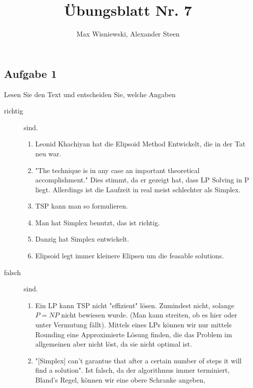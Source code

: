 \documentclass[11pt,a4paper,ngerman]{article}
\date{}
\title{Übungsblatt Nr. 7}
\author{Max Wisniewski, Alexander Steen}
\begin{document}
\renewcommand{\figurename}{Figure}
\maketitle
\thispagestyle{fancy}


\subsection*{Aufgabe 1}

Lesen Sie den Text und entscheiden Sie, welche Angaben

\begin{description}
    \item[richtig] sind.\\
        \begin{enumerate}[1.]
            \item Leonid Khachiyan hat die Elipsoid Method Entwickelt, die in der Tat neu war.
            \item "The technique is in any case an important theoretical accomplishment."
                Dies stimmt, da er gezeigt hat, dass LP Solving in P liegt. Allerdings ist
                die Laufzeit in real meist schlechter als Simplex.
            \item TSP kann man so formulieren.
            \item Man hat Simplex benutzt, das ist richtig.
            \item Danzig hat Simplex entwickelt.
            \item Elipsoid legt immer kleinere Elipsen um die feasable solutions.
        \end{enumerate}
    \item[falsch] sind.\\
         \begin{enumerate}[1.]
            \item Ein LP kann TSP nicht "effizient" lösen. Zumindest nicht, solange $P = NP$ nicht
                bewiesen wurde. (Man kann streiten, ob es hier oder unter Vermutung fällt). Mittels
                eines LPs können wir nur mittels Rounding eine Approximierte Lösung finden, die das
                Problem im allgemeinen aber nicht löst, da sie nicht optimal ist.
            \item "[Simplex] can't garantue that after a certain number of steps it will find a solution".
                Ist falsch, da der algorithmus immer terminiert, Bland's Regel, können wir eine obere Schranke angeben,

\end{enumerate}
\end{description}
\end{document}
